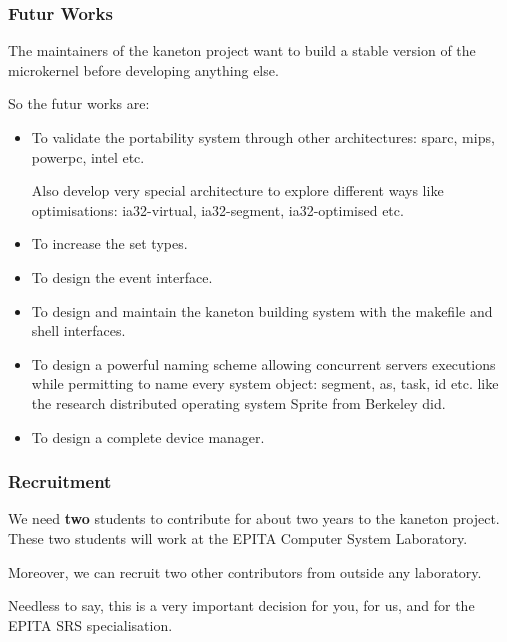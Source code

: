 
\begin{frame}
  \frametitle{Futur Works}

  The maintainers of the kaneton project want to build a stable version
  of the microkernel before developing anything else.

  \-

  So the futur works are:

  \begin{itemize}[<+->]
    \item
      To validate the portability system through other architectures:
      sparc, mips, powerpc, intel etc.

      \-

      Also develop very special architecture to explore different ways
      like optimisations: ia32-virtual, ia32-segment, ia32-optimised etc.
    \item
      To increase the set types.
    \item
      To design the event interface.
    \item
      To design and maintain the kaneton building system with the
      makefile and shell interfaces.
    \item
      To design a powerful naming scheme allowing concurrent
      servers executions while permitting to name every system object:
      segment, as, task, id etc. like the research distributed operating
      system Sprite from Berkeley did.
    \item
      To design a complete device manager.
  \end{itemize}
\end{frame}


\begin{frame}
  \frametitle{Recruitment}

  We need \textbf{two} students to contribute for about two years to
  the kaneton project. These two students will work at the EPITA Computer
  System Laboratory.

  \-

  Moreover, we can recruit two other contributors from outside any laboratory.

  \-

  Needless to say, this is a very important decision for you, for us,
  and for the EPITA SRS specialisation.
\end{frame}


